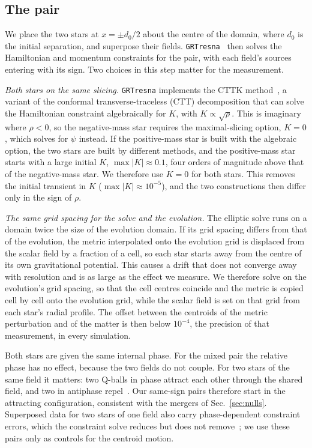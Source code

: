 \documentclass[twocolumn,floatfix,aps,prd,superscriptaddress,nofootinbib]{revtex4-2}
\begin{document}
\subsection{The pair}
\label{sec:construction}

We place the two stars at $x=\pm d_0/2$ about the centre of the domain, where $d_0$ is the initial separation, and superpose their fields. \texttt{GRTresna}~\cite{grtresna} then solves the Hamiltonian and momentum constraints for the pair, with each field's sources entering with its sign. Two choices in this step matter for the measurement.

\emph{Both stars on the same slicing.} \texttt{GRTresna} implements the CTTK method~\cite{cttk}, a variant of the conformal transverse-traceless (CTT) decomposition that can solve the Hamiltonian constraint algebraically for $K$, with $K\propto\sqrt{\rho}$. This is imaginary where $\rho<0$, so the negative-mass star requires the maximal-slicing option, $K=0$, which solves for $\psi$ instead. If the positive-mass star is built with the algebraic option, the two stars are built by different methods, and the positive-mass star starts with a large initial $K$, $\max|K|\approx0.1$, four orders of magnitude above that of the negative-mass star. We therefore use $K=0$ for both stars. This removes the initial transient in $K$ ($\max|K|\approx10^{-5}$), and the two constructions then differ only in the sign of $\rho$.

\emph{The same grid spacing for the solve and the evolution.} The elliptic solve runs on a domain twice the size of the evolution domain. If its grid spacing differs from that of the evolution, the metric interpolated onto the evolution grid is displaced from the scalar field by a fraction of a cell, so each star starts away from the centre of its own gravitational potential. This causes a drift that does not converge away with resolution and is as large as the effect we measure. We therefore solve on the evolution's grid spacing, so that the cell centres coincide and the metric is copied cell by cell onto the evolution grid, while the scalar field is set on that grid from each star's radial profile. The offset between the centroids of the metric perturbation and of the matter is then below $10^{-4}$, the precision of that measurement, in every simulation.

Both stars are given the same internal phase. For the mixed pair the relative phase has no effect, because the two fields do not couple. For two stars of the same field it matters: two Q-balls in phase attract each other through the shared field, and two in antiphase repel~\cite{battye_sutcliffe2000,palenzuela2008}. Our same-sign pairs therefore start in the attracting configuration, consistent with the mergers of Sec.~\ref{sec:nulls}. Superposed data for two stars of one field also carry phase-dependent constraint errors, which the constraint solve reduces but does not remove~\cite{helfer2022}; we use these pairs only as controls for the centroid motion.
\end{document}
